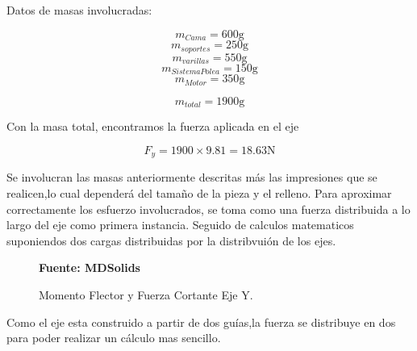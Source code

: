 Datos de masas involucradas:

\[m_{Cama}=600\text{g}\]
\[m_{soportes}=250\text{g}\]
\[m_{varillas}=550\text{g}\]
\[m_{SistemaPolea}=150\text{g}\]
\[m_{Motor}=350\text{g}\]

\begin{equation}
m_{total}=1900\text{g}
\label{eq:105}
\end{equation}

Con la masa total, encontramos la fuerza aplicada en el eje

\begin{equation}
F_y=1900\times9.81=18.63\text{N}
\label{eq:102}
\end{equation}

Se involucran las masas anteriormente descritas más las impresiones que se realicen,lo cual dependerá del tamaño de la pieza y el relleno. Para aproximar correctamente los esfuerzo involucrados, se toma como una fuerza distribuida a lo largo del eje como primera instancia. Seguido de calculos matematicos suponiendos dos cargas distribuidas por la distribvuión de los ejes.\\

\begin{figure}[H]
    \centering
    \caption{Momento Flector y Fuerza Cortante Eje Y.}
    \label{fig:CAL2}
     \textbf{Fuente: MDSolids}
\end{figure}

Como el eje esta construido a partir de dos guías,la fuerza se distribuye en dos para poder realizar un cálculo mas sencillo.

